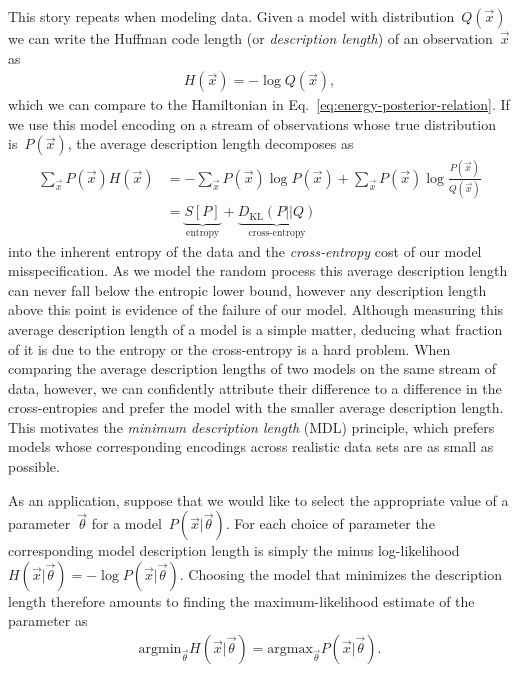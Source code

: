 This story repeats when modeling data. Given a model with distribution~$Q(\vec{x})$ we can write the Huffman code length (or \emph{description length}) of an observation~$\vec{x}$ as \begin{align}
    H(\vec{x}) = -\log Q(\vec{x}),
\end{align} 
which we can compare to the Hamiltonian in Eq.~\eqref{eq:energy-posterior-relation}. If we use this model encoding on a stream of observations whose true distribution is~$P(\vec{x})$, the average description length decomposes as \begin{align}
    \sum_{\vec{x}} P(\vec{x}) H(\vec{x}) &= -\sum_{\vec{x}} P(\vec{x})\log P(\vec{x}) + \sum_{\vec{x}} P(\vec{x})\log \frac{P(\vec{x})}{Q(\vec{x})} \nonumber \\
    &= \underbrace{S[P]}_{\text{entropy}} +  \underbrace{D_{\text{KL}}(P||Q)}_{\text{cross-entropy}}
\end{align}
into the inherent entropy of the data and the \emph{cross-entropy} cost of our model misspecification. As we model the random process this average description length can never fall below the entropic lower bound, however any description length above this point is evidence of the failure of our model. Although measuring this average description length of a model is a simple matter, deducing what fraction of it is due to the entropy or the cross-entropy is a hard problem. When comparing the average description lengths of two models on the same stream of data, however, we can confidently attribute their difference to a difference in the cross-entropies and prefer the model with the smaller average description length. This motivates the \emph{minimum description length} (MDL) principle, which prefers models whose corresponding encodings across realistic data sets are as small as possible. 

As an application, suppose that we would like to select the appropriate value of a parameter~$\vec{\theta}$ for a model~$P(\vec{x}|\vec{\theta})$. For each choice of parameter the corresponding model description length is simply the minus log-likelihood~$H(\vec{x}|\vec{\theta}) = -\log P(\vec{x}|\vec{\theta})$. Choosing the model that minimizes the description length therefore amounts to finding the maximum-likelihood estimate of the parameter as \begin{align}
    \text{argmin}_{\vec{\theta}} H(\vec{x}|\vec{\theta}) = \text{argmax}_{\vec{\theta}} P(\vec{x}|\vec{\theta}).
\end{align}

